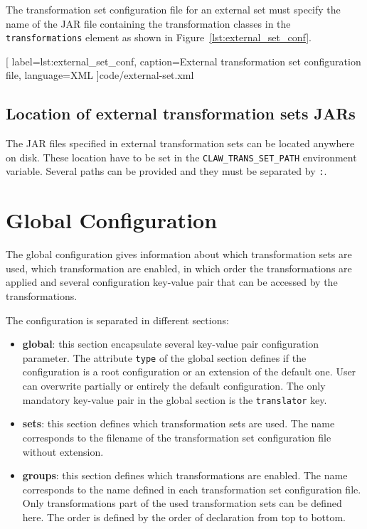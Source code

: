 The transformation set configuration file for an external set must specify the
name of the JAR file containing the transformation classes in the 
\lstinline|transformations| element as shown in 
Figure~\ref{lst:external_set_conf}. 


  [
    label=lst:external_set_conf,
    caption=External transformation set configuration file,
    language=XML
  ]{code/external-set.xml}
  
\subsection{Location of external transformation sets JARs}
The JAR files specified in external transformation sets can be located anywhere
on disk. These location have to be set in the \lstinline!CLAW_TRANS_SET_PATH!
environment variable.
Several paths can be provided and they must be separated by \lstinline!:!.


\section{\clawfcomp Global Configuration}
The global configuration gives information about which transformation sets are
used, which transformation are enabled, in which order the transformations are
applied and several configuration key-value pair that can be accessed by the 
transformations. 

The configuration is separated in different sections: 
\begin{itemize}
\item \textbf{global}: this section encapsulate several key-value pair 
      configuration parameter. The attribute \lstinline!type! of the global
      section defines if the configuration is a root configuration or an 
      extension of the default one. User can overwrite partially or entirely
      the default configuration.
      The only mandatory key-value pair in the global section is the 
      \lstinline!translator! key.
\item \textbf{sets}: this section defines which transformation sets are used.
      The name corresponds to the filename of the transformation set 
      configuration file without extension.
\item \textbf{groups}: this section defines which transformations are enabled.
      The name corresponds to the name defined in each transformation set 
      configuration file.
      Only transformations part of the used transformation sets can be defined
      here.
      The order is defined by the order of declaration from top to bottom.
\end{itemize}


